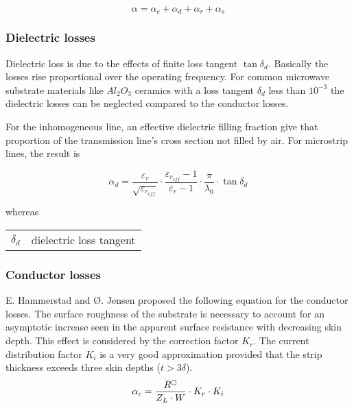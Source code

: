 \begin{equation}
\alpha = \alpha_c + \alpha_d + \alpha_r + \alpha_s
\end{equation}

\subsubsection{Dielectric losses}

Dielectric loss is due to the effects of finite loss tangent
$\tan{\delta_d}$. Basically the losses rise proportional over the
operating frequency.  For common microwave substrate materials like
$Al_2O_3$ ceramics with a loss tangent $\delta_d$ less than $10^{-3}$
the dielectric losses can be neglected compared to the conductor
losses.

\addvspace{12pt}

For the inhomogeneous line, an effective dielectric filling fraction
give that proportion of the transmission line's cross section not
filled by air.  For microstrip lines, the result is

\begin{equation}
\alpha_d = \dfrac{\varepsilon_r}{\sqrt{\varepsilon_{r_{eff}}}}\cdot \dfrac{\varepsilon_{r_{eff}} - 1}{\varepsilon_r - 1}\cdot \dfrac{\pi}{\lambda_0}\cdot \tan{\delta_d}
\end{equation}

whereas

\addvspace{12pt}

\begin{tabular}{rl}
$\delta_d$& dielectric loss tangent
\end{tabular}

\subsubsection{Conductor losses}

E. Hammerstad and {\O}. Jensen \cite{Hammerstad} proposed the following
equation for the conductor losses.  The surface roughness of the
substrate is necessary to account for an asymptotic increase seen in
the apparent surface resistance with decreasing skin depth.  This
effect is considered by the correction factor $K_r$.  The current
distribution factor $K_i$ is a very good approximation provided that
the strip thickness exceeds three skin depths ($t > 3\delta$).
\begin{equation}
\alpha_c = \dfrac{R^{\boxempty}}{Z_L \cdot W}\cdot K_r \cdot K_i
\end{equation}

